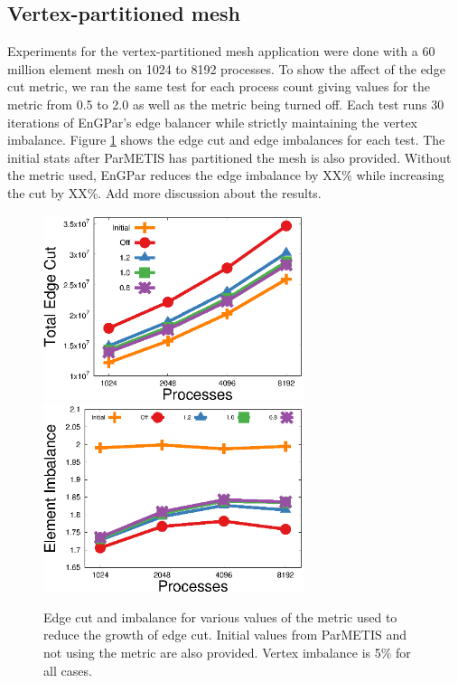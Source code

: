 \documentclass[conference]{IEEEtran}
\begin{document}
\subsection {Vertex-partitioned mesh}
Experiments for the vertex-partitioned mesh application were done with a 60 million
element mesh on 1024 to 8192 processes. To show the affect of the edge cut
metric, we ran the same test for each process count giving values for the metric
from 0.5 to 2.0 as well as the metric being turned off. Each test runs 30 iterations
of EnGPar's edge balancer while strictly maintaining the vertex imbalance. Figure
\ref{fig:metric} shows the edge cut and edge imbalances for each
test. The initial stats after ParMETIS has partitioned the mesh is also provided. Without
the metric used, EnGPar reduces the edge imbalance by XX\% while increasing the cut by
XX\%. {\color{red} Add more discussion about the results.}

\begin{figure}[!ht]
  \centering
  \includegraphics[width=3in]{plots/aepw_edgeCut_collapse_results/ecut_v_cores}
  \includegraphics[width=3in]{plots/aepw_edgeCut_collapse_results/eimb_v_cores}
  \caption{Edge cut and imbalance for various values of the metric used to reduce the growth of edge cut. Initial values from ParMETIS and not using the metric are also provided. Vertex imbalance is 5\% for all cases.}
  \label{fig:metric}
\end{figure}
\end{document}
